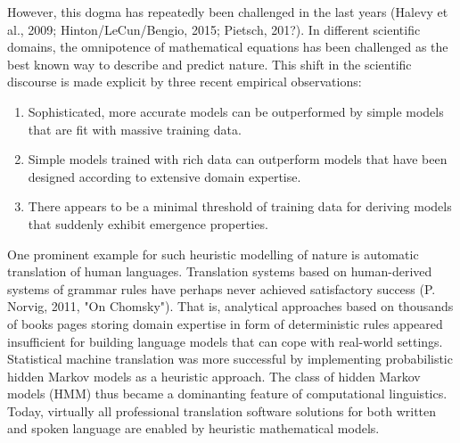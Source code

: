 \documentclass[authoryear,review,3p]{elsarticle}
\begin{document}
However, this dogma has repeatedly been challenged in the last years
(Halevy et al., 2009; Hinton/LeCun/Bengio, 2015; Pietsch, 201?).
In different scientific domains,
the omnipotence of mathematical equations has been challenged
as the
best known way to describe and predict nature.
%
This shift in the scientific discourse is made explicit by
three recent empirical observations:
\begin{enumerate}
  \item Sophisticated, more accurate models can be outperformed by
  simple models that are fit with massive training data.
  \item Simple models trained with rich data can outperform
  models that have been designed according to
  extensive domain expertise.
  \item There appears to be a minimal threshold of training data
  for deriving models that suddenly exhibit emergence properties.
\end{enumerate}

One prominent example for such heuristic modelling of nature is
automatic translation of human languages.
Translation systems based on 
human-derived systems of grammar rules have perhaps never achieved
satisfactory success (P. Norvig, 2011, "On Chomsky").
That is, analytical approaches based on
thousands of books pages storing domain expertise in form of
deterministic rules appeared insufficient for building
language models that can cope with real-world settings.
%
Statistical machine translation was more successful
by implementing probabilistic hidden Markov models
as a heuristic approach.
The class of hidden Markov models (HMM)
thus became a dominanting feature
of computational linguistics.
%
Today, virtually all professional translation software solutions
for both written and spoken language
are enabled by heuristic mathematical models.
\end{document}
